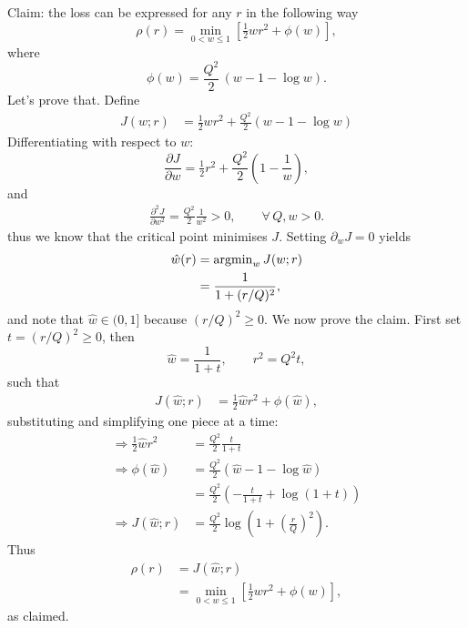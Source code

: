 \documentclass[11pt]{article}
\begin{document}
Claim: the loss can be expressed for any $r$ in the following way
\begin{equation}
    \rho(r) = \min_{0<w\leq1} \left[ \tfrac{1}{2} w r^2 + \phi(w) \right],
\end{equation}
where
\begin{equation}
    \phi(w) = \frac{Q^2}{2}\,(w - 1 - \log w).
\end{equation}
Let's prove that. Define
\begin{align}
    J\left( w ; r \right) &= \tfrac{1}{2} w r^2 + \tfrac{Q^2}{2} \left( w - 1 - \log{w}\right)
\end{align}
Differentiating with respect to $w$:
\begin{equation}
    \frac{\partial J}{\partial w} 
    = \tfrac{1}{2}r^2 + \frac{Q^2}{2}\left(1 - \frac{1}{w}\right),
\end{equation}
and
\begin{align}
    \frac{\partial^2 J}{\partial w^2} = \frac{Q^2}{2} \frac{1}{w^2} > 0, \qquad \forall \, Q,w > 0.
\end{align}
thus we know that the critical point minimises $J$.
Setting $\partial_w J=0$ yields
\begin{align}
    \hat{w}(r) &= {\rm argmin}_w \, J (w ; r) \\
    &= \frac{1}{1 + (r/Q)^2},
\end{align}
and note that $\hat{w} \in (0, 1]$ because $(r/Q)^2 \geq 0$.
We now prove the claim. First set $t = (r/Q)^2 \geq 0$, then
\begin{equation}
    \hat{w} = \frac{1}{1+t}, \qquad r^2 = Q^2 t,
\end{equation}
such that
\begin{align}
    J (\hat{w} ; r) &= \tfrac{1}{2} \hat{w} r^2 + \phi(\hat{w}),
\end{align}
substituting and simplifying one piece at a time:
\begin{align}
    \Rightarrow \tfrac{1}{2} \hat{w} r^2 &= \frac{Q^2}{2} \frac{t}{1 + t} \\
    \Rightarrow \phi(\hat{w}) &= \frac{Q^2}{2} \left( \hat{w} - 1 - \log{\hat{w}} \right) \\
    &= \frac{Q^2}{2} \left( -\frac{t}{1 + t} + \log(1 + t) \right) \\
    \Rightarrow J (\hat{w} ; r) &= \frac{Q^2}{2} \log{\left( 1 + \left( \tfrac{r}{Q}\right)^2 \right)}.
\end{align}
Thus
\begin{align}
    \rho(r) &= J ( \hat{w} ; r ) \\
    &= \min_{0<w\leq1} \left[ \tfrac{1}{2} w r^2 + \phi(w) \right],
\end{align}
as claimed.
\end{document}

